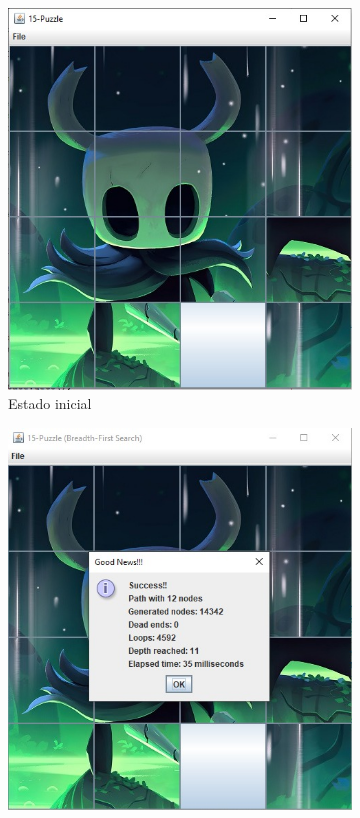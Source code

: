         \begin{figure}[!h]
          \centering
          \begin{subfigure}{0.3\textwidth}
            \includegraphics[width=\textwidth]{Imagenes/inicial2.jpg}
            \caption{Estado inicial}
          \end{subfigure}
          \hfill
          \begin{subfigure}{0.3\textwidth}
            \includegraphics[width=\textwidth]{Imagenes/bfs2.jpg}

\end{subfigure}
\end{figure}

